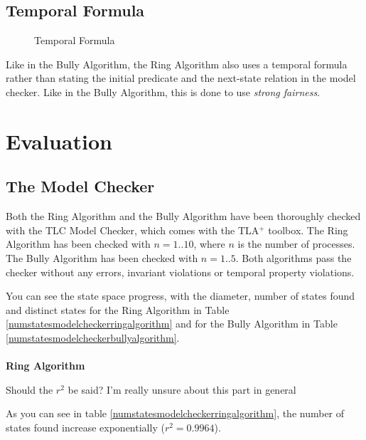 \documentclass{report}
\begin{document}
\section{Temporal Formula}

\begin{figure}
  \tlatex
\@x{}\moduleLeftDash{}\moduleRightDash\@xx{}%
\@x{}\bottombar\@xx{}%
  \caption{Temporal Formula}
  \label{ringtemporalformula}
  \end{figure}

  Like in the Bully Algorithm, the Ring Algorithm also uses a temporal formula rather than stating the initial predicate and the next-state relation in the model checker. Like in the Bully Algorithm, this is done to use \textit{strong fairness}.

\chapter{Evaluation}
\section{The Model Checker}
Both the Ring Algorithm and the Bully Algorithm have been thoroughly checked with the TLC Model Checker, which comes with the TLA$^{+}$ toolbox. The Ring Algorithm has been checked with $n = 1..10$, where $n$ is the number of processes. The Bully Algorithm has been checked with $n = 1..5$. Both algorithms pass the checker without any errors, invariant violations or temporal property violations.

You can see the state space progress, with the diameter, number of states found and distinct states for the Ring Algorithm in Table \ref{numstatesmodelcheckerringalgorithm} and for the Bully Algorithm in Table \ref{numstatesmodelcheckerbullyalgorithm}.
\\\\
\noindent
\textbf{Ring Algorithm}\\
\noindent
\begin{calloutyellow}
  Should the $r^{2}$ be said? I'm really unsure about this part in general
  \end{calloutyellow}
As you can see in table \ref{numstatesmodelcheckerringalgorithm}, the number of states found increase exponentially ($r^{2} = 0.9964$).
\end{document}
